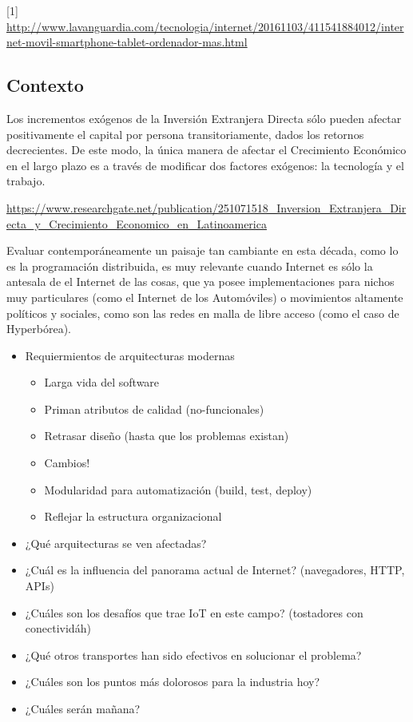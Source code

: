 [1] \url{http://www.lavanguardia.com/tecnologia/internet/20161103/411541884012/internet-movil-smartphone-tablet-ordenador-mas.html}

\subsection{Contexto} %
\label{sub:contexto}


Los incrementos exógenos de la Inversión Extranjera Directa sólo 
pueden afectar positivamente el capital por persona transitoriamente, dados los retornos 
decrecientes. De este modo, la única manera de afectar el Crecimiento Económico en el largo plazo 
es a través de modificar dos factores exógenos: la tecnología y el trabajo. 

\url{https://www.researchgate.net/publication/251071518_Inversion_Extranjera_Directa_y_Crecimiento_Economico_en_Latinoamerica}

Evaluar contemporáneamente un paisaje tan cambiante en esta década, como lo es la programación distribuida, es muy relevante cuando Internet es sólo la antesala de el Internet de las cosas, que ya posee implementaciones para nichos muy particulares (como el Internet de los Automóviles) o movimientos altamente políticos y sociales, como son las redes en malla de libre acceso (como el caso de Hyperbórea).

\begin{itemize}
  \item Requiermientos de arquitecturas modernas
  
  \begin{itemize}
    \item Larga vida del software
    \item Priman atributos de calidad (no-funcionales)
    \item Retrasar diseño (hasta que los problemas existan)
    \item Cambios!
    \item Modularidad para automatización (build, test, deploy)
    \item Reflejar la estructura organizacional
  \end{itemize}

  \item ¿Qué arquitecturas se ven afectadas?
  \item ¿Cuál es la influencia del panorama actual de Internet? (navegadores, HTTP, APIs)
  \item ¿Cuáles son los desafíos que trae IoT en este campo? (tostadores con conectividáh)
  \item ¿Qué otros transportes han sido efectivos en solucionar el problema?
  \item ¿Cuáles son los puntos más dolorosos para la industria hoy?
  \item ¿Cuáles serán mañana?
\end{itemize}

